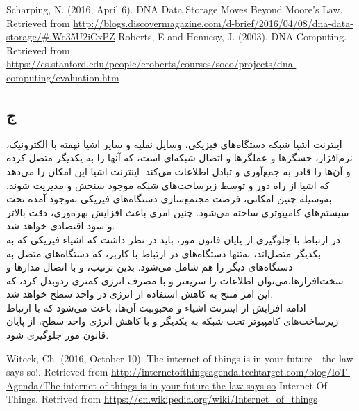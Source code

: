 \documentclass{article}
\begin{document}
\begin{thebibliography}{9}
\begin{LTRbibitems}
\resetlatinfont
{}
Scharping, N. (2016, April 6). DNA Data Storage Moves Beyond Moore’s Law. Retrieved from \url {http://blogs.discovermagazine.com/d-brief/2016/04/08/dna-data-storage/#.Wc35U2iCxPZ}
Roberts, E and Hennesy, J. (2003). DNA Computing. Retrieved from \url {https://cs.stanford.edu/people/eroberts/courses/soco/projects/dna-computing/evaluation.htm}
\end{LTRbibitems}

\end{thebibliography}
\subsection{ج}

اینترنت اشیا شبکه دستگاه‌های فیزیکی، وسایل نقلیه و سایر اشیا نهفته با الکترونیک، نرم‌افزار، حسگرها و عملگرها و اتصال شبکه‌ای است، که آنها را به یکدیگر متصل کرده و آن‌ها را قادر به جمع‌آوری و تبادل اطلاعات می‌کند.
اینترنت اشیا این امکان را می‌دهد که اشیا از راه دور و توسط زیرساخت‌های شبکه موجود سنجش و مدیریت شوند. به‌وسیله چنین امکانی، فرصت مجتمع‌سازی دستگاه‌های فیزیکی به‌وجود آمده تحت سیستم‌های کامپیوتری ساخته می‌شود. چنین امری باعث افزایش بهره‌وری، دقت بالاتر و سود اقتصادی خواهد شد.\\
در ارتباط با جلوگیری از پایان فانون مور، باید در نظر داشت که اشیاء فیزیکی که به بکدیگر متصل‌اند، نه‌تنها دستگاه‌های در ارتباط با کاربر، که دستگاه‌های متصل به دستگاه‌های دیگر را هم شامل می‌شود. بدین ترتیب، و با اتصال مدارها و سخت‌افزارها،‌می‌توان اطلاعات را سریعتر و با مصرف انرژی کمتری ردوبدل کرد، که این امر منتج به کاهش استفاده از انرژی در واحد سطح خواهد شد.\\ادامه افزایش از اینترنت اشیاء و محبوبیت آن‌ها، باعث می‌شود که با ارتباط زیرساخت‌های کامپیوتر تحت شبکه به یکدیگر و با کاهش انرژی واحد سطح، از پایان قانون مور جلوگیری شود.\cite{iot} \cite{iot2}

\begin{thebibliography}{9}
\begin{LTRbibitems}
\resetlatinfont
{}
Witeck, Ch. (2016, October 10). The internet of things is in your future - the law says so!. Retrieved from \url{http://internetofthingsagenda.techtarget.com/blog/IoT-Agenda/The-internet-of-things-is-in-your-future-the-law-says-so}
\resetlatinfont
{}
Internet Of Things. Retrived from \url{https://en.wikipedia.org/wiki/Internet_of_things}
\end{LTRbibitems}

\end{thebibliography}
\end{document}
